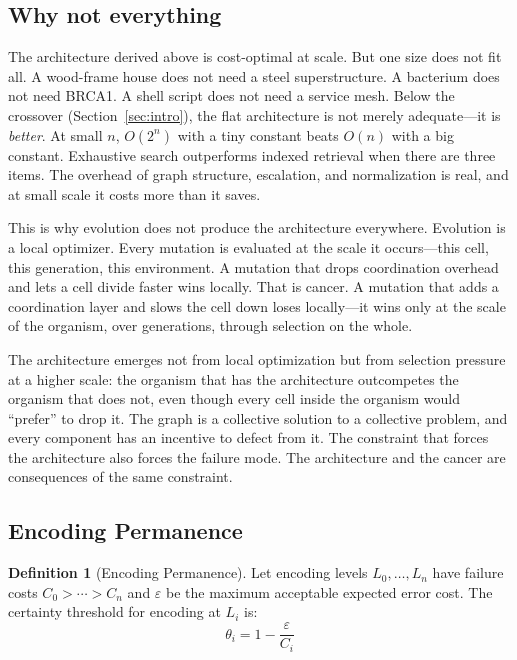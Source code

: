 \documentclass[11pt]{article}
\theoremstyle{definition}
\newtheorem{definition}{Definition}
\theoremstyle{remark}
\begin{document}
\subsection{Why not everything}

The architecture derived above is cost-optimal at scale. But one size
does not fit all. A wood-frame house does not need a steel superstructure.
A bacterium does not need BRCA1. A shell script does not need a
service mesh. Below the crossover (Section~\ref{sec:intro}), the flat
architecture is not merely adequate---it is \emph{better}. At small
$n$, $O(2^n)$ with a tiny constant beats $O(n)$ with a big constant.
Exhaustive search outperforms indexed retrieval when there are three
items. The overhead of graph structure, escalation, and normalization
is real, and at small scale it costs more than it saves.

This is why evolution does not produce the architecture everywhere.
Evolution is a local optimizer. Every mutation is evaluated at the
scale it occurs---this cell, this generation, this environment.
A mutation that drops coordination overhead and lets a cell divide
faster wins locally. That is cancer. A mutation that adds a
coordination layer and slows the cell down loses locally---it wins
only at the scale of the organism, over generations, through
selection on the whole.

The architecture emerges not from local optimization but from
selection pressure at a higher scale: the organism that has the
architecture outcompetes the organism that does not, even though
every cell inside the organism would ``prefer'' to drop it. The
graph is a collective solution to a collective problem, and every
component has an incentive to defect from it. The constraint that
forces the architecture also forces the failure mode. The
architecture and the cancer are consequences of the same constraint.

\subsection{Encoding Permanence}

\begin{definition}[Encoding Permanence]
\label{def:encoding}
Let encoding levels $L_0, \ldots, L_n$ have failure costs
$C_0 > \cdots > C_n$ and $\varepsilon$ be the maximum acceptable
expected error cost. The certainty threshold for encoding at $L_i$ is:
\[
\theta_i = 1 - \frac{\varepsilon}{C_i}
\]
\end{definition}
\end{document}
